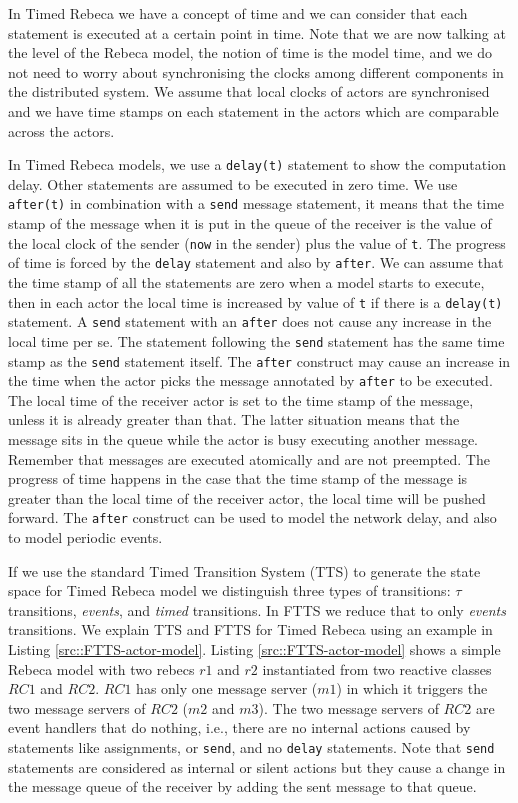 In Timed Rebeca we have a concept of time and we can consider that each statement is executed at a certain point in time. Note that we are now talking at the level of the Rebeca model, the notion of time is the model time, and we do not need to worry about synchronising the clocks among different components in the distributed system. We assume that local clocks of actors are synchronised and we  have time stamps on each statement  in the actors which are comparable across the actors.

In Timed Rebeca models, we use a \texttt{delay(t)} statement to show the computation delay. Other statements are assumed to be executed in zero time. We use  \texttt{after(t)} in combination with a \texttt{send} message statement, it means that the time stamp of the message when it is put in the queue of the receiver is the value of the local clock of the sender (\texttt{now} in the sender) plus the value of \texttt{t}.
The progress of time is forced by the \texttt{delay} statement and also by \texttt{after}. 
We can assume that the time stamp of all the statements are zero when a model starts to execute, then in each actor the local time is increased by value of \texttt{t} if there is a \texttt{delay(t)} statement.
A \texttt{send} statement with an  \texttt{after} does not cause any increase in the local time per se. The statement following the \texttt{send} statement has the same time stamp as the \texttt{send} statement itself.
The \texttt{after} construct may cause an increase in the time when the actor picks the message annotated by \texttt{after} to be executed. The local time of the receiver actor is set to the time stamp of the message, unless it is already greater than that.
The latter situation means that the message  sits in the queue while the actor is busy executing another message.
Remember that messages are executed atomically and are not preempted.
%
The progress of time happens in the case that the time stamp of the message is greater than the local time of the receiver actor, the local time will be pushed forward.
%
The \texttt{after} construct can be used to model the network delay, and also to model periodic events.


If we use the standard Timed Transition System (TTS) to generate the state space for Timed Rebeca model we distinguish three types of transitions: $\tau$ transitions, \textit{events}, and \textit{timed} transitions.
In FTTS we reduce that to only \textit{events} transitions.
%
We explain TTS and FTTS for Timed Rebeca using an example in Listing \ref{src::FTTS-actor-model}.
Listing \ref{src::FTTS-actor-model} shows a simple Rebeca model with two rebecs $r1$ and $r2$ instantiated from two reactive classes $RC1$ and $RC2$.
$RC1$ has only one message server ($m1$) in which it triggers the two message servers of $RC2$ ($m2$ and $m3$).
The two message servers of $RC2$ are event handlers that do nothing, i.e., there are no internal actions caused by statements like assignments, or \texttt{send}, and no  \texttt{delay} statements. Note that \texttt{send} statements are considered as internal or silent actions but they cause a change in the message queue of the receiver by adding the sent message to that queue.
 

